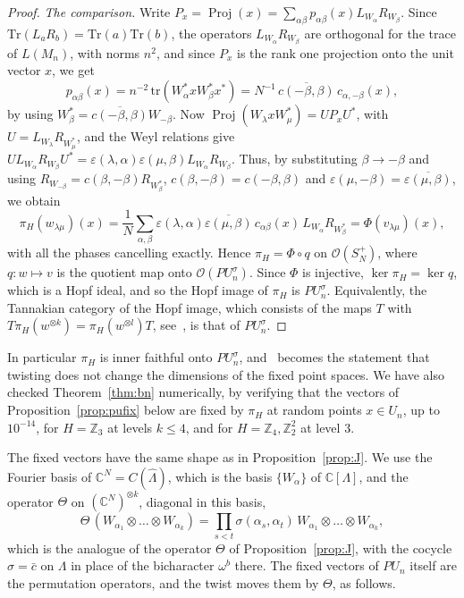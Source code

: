 \documentclass[11pt]{amsart}
\theoremstyle{definition}
\theoremstyle{remark}
\theoremstyle{plain}
\numberwithin{equation}{section}
\numberwithin{table}{section}
\newcommand{\C}{\mathbb C}
\newcommand{\Z}{\mathbb Z}
\DeclareMathOperator{\Proj}{Proj}
\begin{document}
\begin{proof}
\emph{The comparison.} Write $P_x=\Proj(x)=\sum_{\alpha\beta}p_{\alpha\beta}(x)L_{W_\alpha}R_{W_\beta}$. Since $\mathrm{Tr}(L_aR_b)=\mathrm{Tr}(a)\mathrm{Tr}(b)$, the operators $L_{W_\alpha}R_{W_\beta}$ are orthogonal for the trace of $L(M_n)$, with norms $n^2$, and since $P_x$ is the rank one projection onto the unit vector $x$, we get
\[
p_{\alpha\beta}(x)=n^{-2}\,\mathrm{tr}(W_\alpha^*xW_\beta^*x^*)=N^{-1}\,\overline{c(-\beta,\beta)}\,c_{\alpha,-\beta}(x),
\]
by using $W_\beta^*=\overline{c(-\beta,\beta)}W_{-\beta}$. Now $\Proj(W_\lambda xW_\mu^*)=UP_xU^*$, with $U=L_{W_\lambda}R_{W_\mu^*}$, and the Weyl relations give $UL_{W_\alpha}R_{W_\beta}U^*=\varepsilon(\lambda,\alpha)\varepsilon(\mu,\beta)L_{W_\alpha}R_{W_\beta}$. Thus, by substituting $\beta\to-\beta$ and using $R_{W_{-\beta}}=c(\beta,-\beta)R_{W_\beta^*}$, $c(\beta,-\beta)=c(-\beta,\beta)$ and $\varepsilon(\mu,-\beta)=\overline{\varepsilon(\mu,\beta)}$, we obtain
\[
\pi_H(w_{\lambda\mu})(x)=\frac1N\sum_{\alpha,\beta}\varepsilon(\lambda,\alpha)\overline{\varepsilon(\mu,\beta)}\,c_{\alpha\beta}(x)\,L_{W_\alpha}R_{W_\beta^*}=\Phi(v_{\lambda\mu})(x),
\]
with all the phases cancelling exactly. Hence $\pi_H=\Phi\circ q$ on $\mathcal O(S_N^+)$, where $q:w\mapsto v$ is the quotient map onto $\mathcal O(PU_n^\sigma)$. Since $\Phi$ is injective, $\ker\pi_H=\ker q$, which is a Hopf ideal, and so the Hopf image of $\pi_H$ is $PU_n^\sigma$. Equivalently, the Tannakian category of the Hopf image, which consists of the maps $T$ with $T\pi_H(w^{\otimes k})=\pi_H(w^{\otimes l})T$, see~\cite{bqp}, is that of $PU_n^\sigma$.
\end{proof}

In particular $\pi_H$ is inner faithful onto $PU_n^\sigma$, and~\cite[Thm.~4.3]{bn} becomes the statement that twisting does not change the dimensions of the fixed point spaces. We have also checked Theorem~\ref{thm:bn} numerically, by verifying that the vectors of Proposition~\ref{prop:pufix} below are fixed by $\pi_H$ at random points $x\in U_n$, up to $10^{-14}$, for $H=\Z_3$ at levels $k\le4$, and for $H=\Z_4,\Z_2^2$ at level $3$.

The fixed vectors have the same shape as in Proposition~\ref{prop:J}. We use the Fourier basis of $\C^N=C(\widehat\Lambda)$, which is the basis $\{W_\alpha\}$ of $\C[\Lambda]$, and the operator $\Theta$ on $(\C^N)^{\otimes k}$, diagonal in this basis,
\[
\Theta\,(W_{\alpha_1}\otimes\dots\otimes W_{\alpha_k})=\prod_{s<t}\sigma(\alpha_s,\alpha_t)\,W_{\alpha_1}\otimes\dots\otimes W_{\alpha_k},
\]
which is the analogue of the operator $\Theta$ of Proposition~\ref{prop:J}, with the cocycle $\sigma=\bar c$ on $\Lambda$ in place of the bicharacter $\omega^{b}$ there. The fixed vectors of $PU_n$ itself are the permutation operators, and the twist moves them by $\Theta$, as follows.
\end{document}

